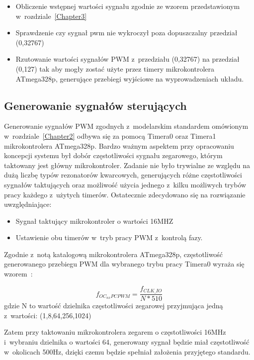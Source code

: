 \documentclass[11pt, twoside]{Thesis} %
\begin{document}
\begin{itemize}
	\item Obliczenie wstępnej wartości sygnału zgodnie ze wzorem przedstawionym w~rozdziale~\ref{Chapter3}
	\item Sprawdzenie czy sygnał pwm nie wykroczył poza dopuszczalny przedział (0,32767)
	\item Rzutowanie wartości sygnałów PWM z~przedziału (0,32767) na przedział (0,127) tak aby mogły zostać użyte przez timery mikrokontrolera ATmega328p, generujące przebiegi wyjściowe na wyprowadzeniach układu. 
\end{itemize}


\subsection{Generowanie sygnałów sterujących}

Generowanie sygnałów PWM zgodnych z~modelarskim standardem omówionym w~rozdziale~\ref{Chapter2} odbywa się za pomocą Timera0 oraz Timera1 mikrokontrolera ATmega328p. Bardzo ważnym aspektem przy opracowaniu koncepcji systemu był dobór częstotliwości sygnału zegarowego, którym taktowany jest główny mikrokontroler. Zadanie nie było trywialne ze względu na dużą liczbę typów rezonatorów kwarcowych, generujących różne częstotliwości sygnałów taktujących oraz możliwość użycia jednego z~kilku możliwych trybów pracy każdego z~użytych timerów. Ostatecznie zdecydowano się na rozwiązanie uwzględniające:
\begin{itemize}
	\item Sygnał taktujący mikrokontroler o wartości 16MHZ
	\item Ustawienie obu timerów w~tryb pracy PWM z~kontrolą fazy.
\end{itemize}

Zgodnie z~notą katalogową mikrokontrolera ATmega328p, częstotliwość generowanego przebiegu PWM dla wybranego trybu pracy Timera0 wyraża się wzorem~\cite{ds_atmega328p}:

\begin{equation}
	f_{OC_{nx}PCPWM} = \frac{f_{CLK\_IO}}{N * 510}
\end{equation}
gdzie N to wartość dzielnika częstotliwości zegarowej przyjmująca jedną z~wartości: (1,8,64,256,1024)
 
Zatem przy taktowaniu mikrokontrolera zegarem o częstotliwości 16MHz i~wybraniu dzielnika o wartości 64, generowany sygnał będzie miał częstotliwość w~okolicach 500Hz, dzięki czemu będzie spełniał założenia przyjętego standardu. 
\end{document}
